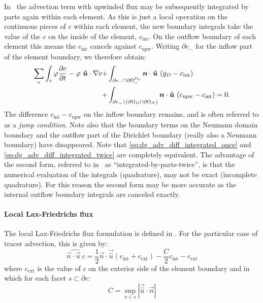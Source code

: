 In \fluidity\ the advection term with upwinded flux may be subsequently
integrated by parts again within each element. As this is just a local
operation on the continuous pieces of $c$ within each element, the new
boundary integrals take the value of the $c$ on the inside of the element,
$c_{\mathrm{int}}$. On the outflow boundary of each element this means the
$c_{\mathrm{int}}$ cancels against $c_{\mathrm{upw}}$. Writing $\partial
e_-$ for the inflow part of the element boundary, we therefore obtain:
\begin{equation}
\begin{split}
  \sum_e\int_e \varphi \frac{\partial c}{\partial t}
  - \varphi~{\mbox{\boldmath$\hat u$}}\cdot\nabla c 
    +& \int_{\partial e_- \cap\partial\Omega^{D_c}_-} {\mbox{\boldmath$n$}}\cdot{\mbox{\boldmath$\hat u$}}~(g_D -c_{\mathrm{int}}) \\
    +& \int_{\partial e_-\setminus (\partial\Omega_D\cap\partial\Omega_N)}
    {\mbox{\boldmath$n$}}\cdot{\mbox{\boldmath$\hat u$}}~
      (c_{\mathrm{upw}}-c_{\mathrm{int}})=0.
    \label{eq:dg_adv_diff_integrated_twice}
\end{split}
\end{equation}
The difference $c_{\mathrm{int}}-c_{\mathrm{upw}}$ on the inflow boundary
remains, and is often referred to as a \emph{jump condition}. Note also that
the boundary terms on the Neumann domain boundary and the outflow part of
the Dirichlet boundary (really also a Neumann boundary) have disappeared.
Note that \eqref{eq:dg_adv_diff_integrated_once} and
\eqref{eq:dg_adv_diff_integrated_twice} are completely equivalent. The
advantage of the second form, referred to in \fluidity\ as
``integrated-by-parts-twice'', is that the numerical evaluation of the
integrals (quadrature), may not be exact (incomplete quadrature). For this
reason the second form may be more accurate as the internal outflow boundary
integrals are canceled exactly.

\paragraph{Local Lax-Friedrichs flux}

The local Lax-Friedrichs flux formulation is defined in
\citet[p208]{Cockburn2001}. For the
particular case of tracer advection, this is given by:
\begin{equation}
  \widehat{\vec{n}\cdot\vec{u}~c}=\frac{1}{2}\vec{n}\cdot\vec{\hat u}
  \left(c_{\mathrm{int}}+c_{\mathrm{ext}}\right)
  -\frac{C}{2}c_{\mathrm{int}}-c_{\mathrm{ext}}
\end{equation}
where $c_{\mathrm{ext}}$ is the value of $c$ on the exterior side of the
  element boundary and in which for each facet $s\subset\partial e$:
\begin{equation}
  C= \sup_{x\in s}|\vec{\hat u}\cdot\vec{n}|
\end{equation}

